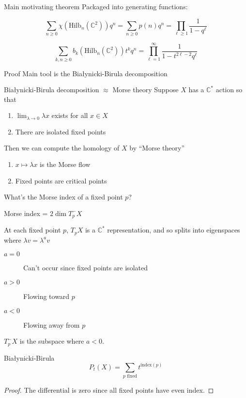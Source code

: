 \documentclass{beamer}
\newcommand{\Hilb}{\textrm{Hilb}}
\newcommand{\C}{\mathbb{C}}
\begin{document}
\begin{frame}{Main motivating theorem}
Packaged into generating functions:
\begin{Theorem}[Warm-up]
$$\sum_{n\geq 0} \chi(\Hilb_n(\C^2))q^n=\sum_{n\geq0} p(n)q^n=\prod_{\ell\geq 1} \frac{1}{1-q^\ell}$$
\end{Theorem}

\begin{theorem}
$$\sum_{k,n \geq 0} b_k(\Hilb_n(\C^2))t^k q^n=\prod_{\ell=1}^\infty \frac{1}{1-t^{2\ell-2}q^\ell}$$
\end{theorem}
\begin{block}{Proof}
 Main tool is the \alert{Bia\l ynicki-Birula decomposition}
 \end{block}

\end{frame}




\begin{frame}{Bia\l ynicki-Birula decomposition $\approx$ Morse theory}
Suppose $X$ has a $\C^*$ action so that

\begin{enumerate}
\item $\lim_{\lambda\to 0} \lambda x$ exists for all $x\in X$
\item There are isolated fixed points
\end{enumerate}

Then we can compute the homology of $X$ by ``Morse theory''
\begin{enumerate}
\item $x\mapsto\lambda x$ is the Morse flow
\item Fixed points are critical points
\end{enumerate}

\begin{block}{What's the Morse index of a fixed point $p$?}
\end{block}
\end{frame}



\begin{frame}{Morse index = $2\dim T^-_pX$}

At each fixed point $p$, $T_pX$ is a $\C^*$ representation, and so splits into eigenspaces where $\lambda v=\lambda^a v$

\begin{description}
\item[$a=0$] Can't occur since fixed points are isolated
\item[$a>0$]  Flowing toward $p$
\item [$a<0$] Flowing away from $p$ 
\end{description}
$T^-_pX$ is the subspace where $a<0$.

\begin{Theorem}{Bia\l ynicki-Birula}
$$P_t(X)=\sum_{p\textrm{ fixed}} t^{\textrm{index}(p)}$$
\end{Theorem}
\begin{proof}
The differential is zero since all fixed points have even index.
\end{proof}
\end{frame}
\end{document}
